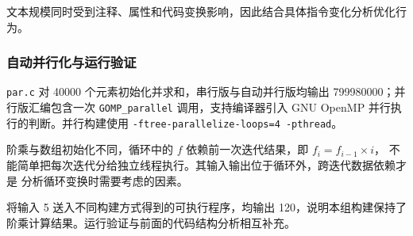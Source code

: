 文本规模同时受到注释、属性和代码变换影响，因此结合具体指令变化分析优化行为。

\subsubsection{自动并行化与运行验证}
\texttt{par.c} 对 40000 个元素初始化并求和，串行版与自动并行版均输出
799980000；并行版汇编包含一次 \texttt{GOMP\_parallel} 调用，支持编译器引入
GNU OpenMP 并行执行的判断。并行构建使用 \texttt{-ftree-parallelize-loops=4 -pthread}。


阶乘与数组初始化不同，循环中的 $f$ 依赖前一次迭代结果，即 $f_i=f_{i-1}\times i$，
不能简单把每次迭代分给独立线程执行。其输入输出位于循环外，跨迭代数据依赖才是
分析循环变换时需要考虑的因素。

将输入 5 送入不同构建方式得到的可执行程序，均输出 120，说明本组构建保持了
阶乘计算结果。运行验证与前面的代码结构分析相互补充。
